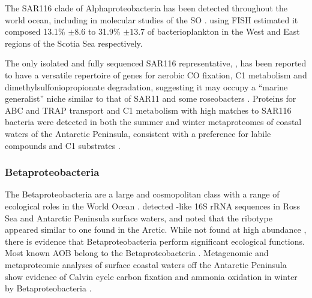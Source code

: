 
The SAR116 clade of Alphaproteobacteria has been detected throughout the world ocean, including in molecular studies of the \ac{SO} \cite{West:2008kc,Topping:2006ul}.
 \citet{Topping:2006ul} using \ac{FISH} estimated it composed 13.1\% $\pm 8.6$ to 31.9\% $\pm13.7$ of bacterioplankton in the West and East regions of the Scotia Sea respectively.

The only isolated and fully sequenced SAR116 representative, , has been reported to have a versatile repertoire of genes for aerobic CO fixation, C1 metabolism and dimethylsulfoniopropionate degradation, suggesting it may occupy a ``marine generalist'' niche similar to that of SAR11 and some roseobacters \cite{Oh:2010di}.
Proteins for ABC and TRAP transport and C1 metabolism with high matches to SAR116 bacteria were detected in both the summer and winter metaproteomes of coastal waters of the Antarctic Peninsula, consistent with a preference for labile compounds and C1 substrates \cite{Williams:2012bs}.

\subsubsection{Betaproteobacteria}

The Betaproteobacteria are a large and cosmopolitan class with a range of ecological roles in the World Ocean \citep[reviewed in][]{Kirchman:2008wz}.
\citet{Hollibaugh:2002em} detected -like 16S rRNA sequences in Ross Sea and Antarctic Peninsula surface waters, and noted that the ribotype appeared similar to one found in the Arctic.
While not found at high abundance \cite{Gentile:2006ef,Ghiglione:2011ee,Jamieson:2012up}, there is evidence that Betaproteobacteria perform significant ecological functions.
Most known \ac{AOB} belong to the Betaproteobacteria \cite{Head:1993vt,Teske:1994wt}.
Metagenomic and metaproteomic analyses of surface coastal waters off the Antarctic Peninsula show evidence of Calvin cycle carbon fixation and ammonia oxidation in winter by Betaproteobacteria \cite{Grzymski:2012ej,Williams:2012bs}.


